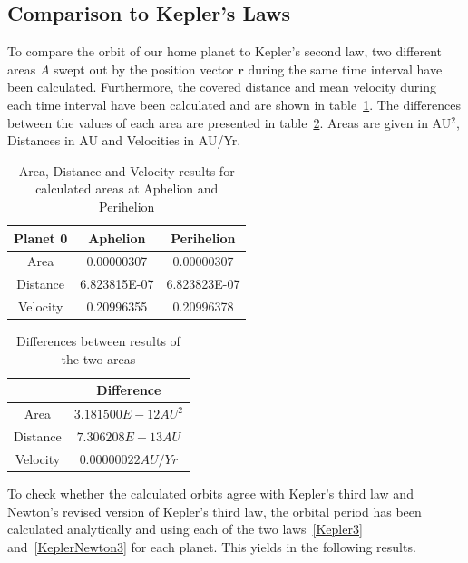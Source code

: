 \documentclass[reprint,english,notitlepage]{revtex4-2}
\begin{document}
\subsection{Comparison to Kepler's Laws}
	To compare the orbit of our home planet to Kepler's second law, two different areas $A$ swept out by the position vector $ \textbf{r}$ during the same time interval have been calculated.
	Furthermore, the covered distance and mean velocity during each time interval have been calculated and are shown in table~\ref{tab:Kepler2_table1}.
	The differences between the values of each area are presented in table~\ref{tab:Kepler2_table2}.
	Areas are given in AU$^2$, Distances in AU and Velocities in AU/Yr.
\begin{table}[h]
    \begin{tabular}{ |c|c|c| }
		\hline
        Planet 0 & Aphelion & Perihelion\\
        \hline
        Area & 0.00000307 & 0.00000307\\
        \hline
		Distance & 6.823815E-07 & 6.823823E-07\\
		\hline
		Velocity & 0.20996355 & 0.20996378\\
		\hline
    \end{tabular}
	\caption{Area, Distance and Velocity results for calculated areas at Aphelion and Perihelion}
	\label{tab:Kepler2_table1}
\end{table}




\begin{table}[h]
    \begin{tabular}{ |c|c| }
		\hline
		 & Difference\\
		\hline
		Area & $ 3.181500E-12 AU^2 $\\
		\hline
		Distance & $ 7.306208E-13 AU $\\
		\hline
		Velocity & $  0.00000022 AU/Yr $\\
		\hline
	\end{tabular}
    \caption{Differences between results of the two areas}
    \label{tab:Kepler2_table2}
\end{table}

	To check whether the calculated orbits agree with Kepler's third law and Newton's revised version of Kepler's third law, the orbital period has been calculated analytically and using each of the two laws~\eqref{Kepler3} and~\eqref{KeplerNewton3} for each planet.
	This yields in the following results.\\
\end{document}
